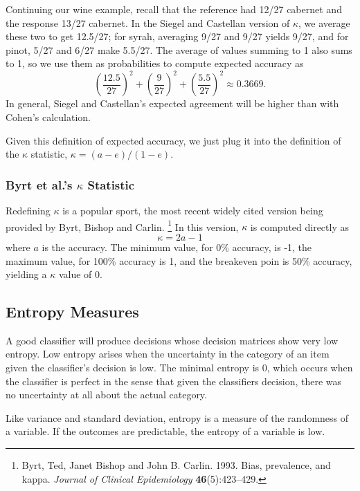 Continuing our wine example, recall that the reference had 12/27
cabernet and the response 13/27 cabernet.  In the Siegel and Castellan
version of $\kappa$, we average these two to get 12.5/27; for syrah,
averaging 9/27 and 9/27 yields 9/27, and for pinot, 5/27 and 6/27 make
5.5/27.  The average of values summing to 1 also sums to 1, so we use
them as probabilities to compute expected accuracy as
%
\begin{equation}
\left( \frac{12.5}{27} \right)^2
+ \left( \frac{9}{27} \right)^2
+ \left( \frac{5.5}{27} \right)^2
\approx 0.3669.
\end{equation}
%
In general, Siegel and Castellan's expected agreement will be higher
than with Cohen's calculation.

Given this definition of expected accuracy, we just plug it into the
definition of the $\kappa$ statistic, $\kappa = (a - e)/(1 - e)$.


\subsubsection{Byrt et al.'s $\kappa$ Statistic}

Redefining $\kappa$ is a popular sport, the most recent widely cited
version being provided by Byrt, Bishop and Carlin.%
%
\footnote{Byrt, Ted, Janet Bishop and John B. Carlin. 1993. Bias,
  prevalence, and kappa. {\it Journal of Clinical Epidemiology}
  {\bf 46}(5):423--429.}
%
In this version, $\kappa$ is computed directly as
%
\begin{equation}
\kappa = 2 a - 1
\end{equation}
%
where $a$ is the accuracy.  The minimum value, for 0\% accuracy,
is -1, the maximum value, for 100\% accuracy is 1, and the
breakeven poin is 50\% accuracy, yielding a $\kappa$ value of 0.


\subsection{Entropy Measures}



A good classifier will produce decisions whose decision matrices show
very low entropy.  Low entropy arises when the uncertainty in the
category of an item given the classifier's decision is low.  The
minimal entropy is 0, which occurs when the classifier is perfect in
the sense that given the classifiers decision, there was no
uncertainty at all about the actual category.

Like variance and standard deviation, entropy is a measure of the
randomness of a variable.  If the outcomes are predictable, the entropy 
of a variable is low.


